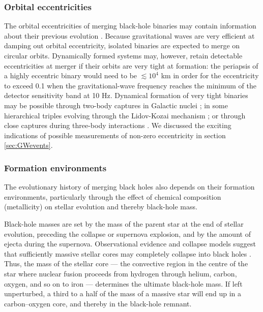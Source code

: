 \documentclass[review]{elsarticle}
\begin{document}
\subsubsection{Orbital eccentricities}
	The orbital eccentricities of merging black-hole binaries may contain information about their previous evolution \citep{MandelOShaughnessy:2010}. Because gravitational waves are very efficient at damping out orbital eccentricity, isolated binaries are expected to merge on circular orbits. Dynamically formed systems may, however, retain detectable eccentricities at merger if their orbits are very tight at formation: the periapsis of a highly eccentric binary would need to be $\lesssim 10^4$ km in order for the eccentricity to exceed 0.1 when the gravitational-wave frequency reaches the minimum of the detector sensitivity band at 10 Hz.  Dynamical formation of very tight binaries may be possible through two-body captures in Galactic nuclei \citep[][but see \cite{Tsang:2013}]{OLeary:2008}; in some hierarchical triples evolving through the Lidov-Kozai mechanism \citep[e.g.,][]{AntoniniPerets:2012}; or through close captures during three-body interactions \citep{Samsing:2014, Rodriguez:2018}.  We discussed the exciting indications of possible measurements of non-zero eccentricity \citep{RomeroShaw:2021} in section \ref{sec:GWevents}.


\subsubsection{Formation environments}
\label{environ}
The evolutionary history of merging black holes also depends on their formation environments, particularly through the effect of chemical composition (metallicity) on stellar evolution and thereby black-hole mass.

Black-hole masses are set by the mass of the parent star at the end of stellar evolution, preceding the collapse or supernova explosion, and by the amount of ejecta during the supernova. Observational evidence and collapse models suggest that sufficiently massive stellar cores may completely collapse into black holes \citep[for a review, see][]{Mirabel:2016}. Thus, the mass of the stellar core --- the convective region in the centre of the star where nuclear fusion proceeds from hydrogen through helium, carbon, oxygen, and so on to iron --- determines the ultimate black-hole mass.  If left unperturbed, a third to a half of the mass of a massive star will end up in a carbon--oxygen core, and thereby in the black-hole remnant.
\end{document}
